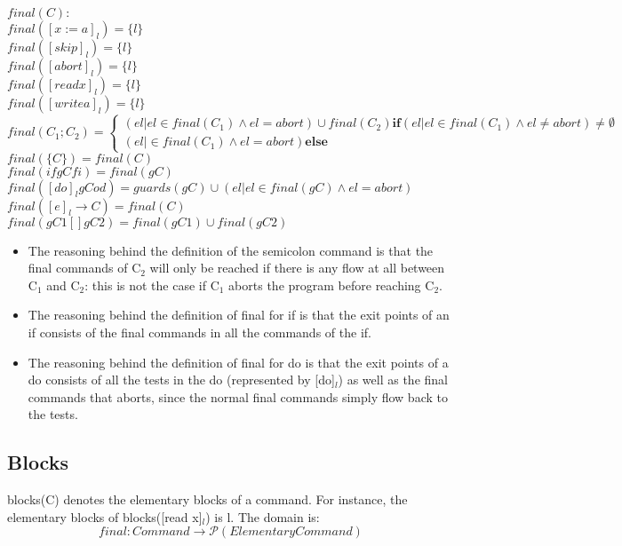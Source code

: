 \docpar

$final(C):$\\
$final([x := a]_l)     = \{l\}$\\
$final([skip]_l)       = \{l\}$\\
$final([abort]_l)      = \{l\}$\\
$final([read x]_l)     = \{l\}$\\
$final([write a]_l)    = \{l\}$\\
$final(C_1; C_2)		  =
\begin{cases}
(el \vert el \in final(C_1) \wedge el = abort) \cup final(C_2) \textbf{if} (el \vert el \in final(C_1) \wedge el \neq abort) \neq \emptyset \\
(el \vert \in final(C_1) \wedge el = abort) \textbf{else}
\end{cases}$\\
$final(\{C\})          = final(C)$\\
$final(if gC fi)       = final(gC)$\\
$final([do]_l gC od)  = 
guards(gC) \cup (el \vert el \in final(gC) \wedge el = abort)$\\
$final([e]_l \to C)    = final(C)$\\
$final(gC1 [] gC2)      = final(gC1) \cup final(gC2)$\\

\begin{itemize}
\item The reasoning behind the definition of the semicolon command is that the
final commands of C$_2$ will only be reached if there is any flow at all
between C$_1$ and C$_2$: this is not the case if C$_1$ aborts the program
before reaching C$_2$.
\item The reasoning behind the definition of final for if is that the exit points
of an if consists of the final commands in all the commands of the if.
\item The reasoning behind the definition of final for do is that the exit points
of a do consists of all the tests in the do (represented by [do]$_l$)
as well as the final commands that aborts, since the normal final commands
simply flow back to the tests.
\end{itemize}



\subsection{Blocks}

blocks(C) denotes the elementary blocks of a command.
For instance, the elementary blocks of blocks([read x]$_l$) is l. The domain is:
\[final \colon Command \to \mathcal{P}(Elementary Command)\]

